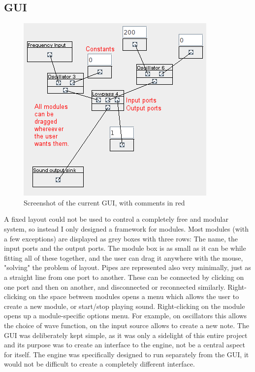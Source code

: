 \documentclass[11pt,a4paper]{article}
\begin{document}
\subsection{GUI}
\begin{figure}[ht]
\caption{Screenshot of the current GUI, with comments in red}
\includegraphics[width=\textwidth]{GUI_cropped}
\end{figure}
A fixed layout could not be used to control a completely free and modular system, so instead I only designed a framework for modules. Most modules (with a few exceptions) are displayed as grey boxes with three rows: The name, the input ports and the output ports. The module box is as small as it can be while fitting all of these together, and the user can drag it anywhere with the mouse, "solving" the problem of layout. Pipes are represented also very minimally, just as a straight line from one port to another. These can be connected by clicking on one port and then on another, and disconnected or reconnected similarly. Right-clicking on the space between modules opens a menu which allows the user to create a new module, or start/stop playing sound. Right-clicking on the module opens up a module-specific options menu. For example, on oscillators this allows the choice of wave function, on the input source allows to create a new note.
The GUI was deliberately kept simple, as it was only a sidelight of this entire project and its purpose was to create an interface to the engine, not be a central aspect for itself. The engine was specifically designed to run separately from the GUI, it would not be difficult to create a completely different interface.
\end{document}
